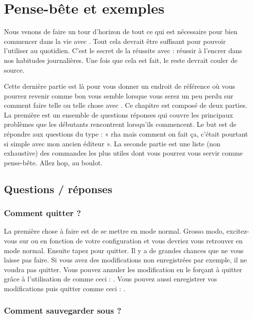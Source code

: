 \chapter{Pense-bête et exemples}

Nous venons de faire un tour d'horizon de tout ce qui est nécessaire pour bien commencer dans la vie avec \vim. Tout cela devrait être suffisant pour pouvoir l'utiliser au quotidien. C'est le secret de la réussite avec \vim : réussir à l'encrer dans nos habitudes journalières. Une fois que cela est fait, le reste devrait couler de source.

Cette dernière partie est là pour vous donner un endroit de référence où vous pourrez revenir comme bon vous semble lorsque vous serez un peu perdu sur comment faire telle ou telle chose avec \vim. Ce chapitre est composé de deux parties. La première est un ensemble de questions réponses qui couvre les principaux problèmes que les débutants rencontrent lorsqu'ils commencent. Le but est de répondre aux questions du type : « rha mais comment on fait ça, c'était pourtant si simple avec mon ancien éditeur ». La seconde partie est une liste (non exhaustive) des commandes \vim les plus utiles dont vous pourrez vous servir comme pense-bête. Allez hop, au boulot.

\section{Questions / réponses}

\subsection{Comment quitter \vim ?}

La première chose à faire est de se mettre en mode normal. Grosso modo, excitez-vous sur \ttesc ou \ttsemicolon en fonction de votre configuration et vous devriez vous retrouver en mode normal. Ensuite tapez  pour quitter. Il y a de grandes chances que \vim ne vous laisse pas faire. Si vous avez des modifications non enregistrées par exemple, il ne voudra pas quitter. Vous pouvez annuler les modification en le forçant à quitter grâce à l'utilisation de \vimcmd{!} comme ceci : . Vous pouvez aussi enregistrer vos modifications puis quitter comme ceci : .

\subsection{Comment sauvegarder sous ?}

